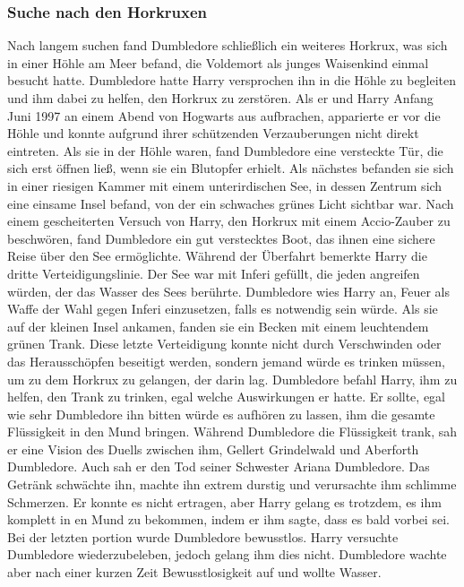 \documentclass[a4paper, 10pt]{article}
\begin{document}
\subsubsection*{Suche nach den Horkruxen}
Nach langem suchen fand Dumbledore schließlich ein weiteres Horkrux, was sich in einer Höhle am Meer befand, die Voldemort als junges Waisenkind einmal besucht hatte. Dumbledore hatte Harry versprochen ihn in die Höhle zu begleiten und ihm dabei zu helfen, den Horkrux zu zerstören. Als er und Harry Anfang Juni 1997 an einem Abend von Hogwarts aus aufbrachen, apparierte er vor die Höhle und konnte aufgrund ihrer schützenden Verzauberungen nicht direkt eintreten. Als sie in der Höhle waren, fand Dumbledore eine versteckte Tür, die sich erst öffnen ließ, wenn sie ein Blutopfer erhielt.
\vspace{10pt}
\newline
Als nächstes befanden sie sich in einer riesigen Kammer mit einem unterirdischen See, in dessen Zentrum sich eine einsame Insel befand, von der ein schwaches grünes Licht sichtbar war. Nach einem gescheiterten Versuch von Harry, den Horkrux mit einem Accio-Zauber zu beschwören, fand Dumbledore ein gut verstecktes Boot, das ihnen eine sichere Reise über den See ermöglichte. Während der Überfahrt bemerkte Harry die dritte Verteidigungslinie. Der See war mit Inferi gefüllt, die jeden angreifen würden, der das Wasser des Sees berührte. Dumbledore wies Harry an, Feuer als Waffe der Wahl gegen Inferi einzusetzen, falls es notwendig sein würde.
\vspace{10pt}
\newline
Als sie auf der kleinen Insel ankamen, fanden sie ein Becken mit einem leuchtendem grünen Trank. Diese letzte Verteidigung konnte nicht durch Verschwinden oder das Herausschöpfen beseitigt werden, sondern jemand würde es trinken müssen, um zu dem Horkrux zu gelangen, der darin lag. Dumbledore befahl Harry, ihm zu helfen, den Trank zu trinken, egal welche Auswirkungen er hatte. Er sollte, egal wie sehr Dumbledore ihn bitten würde es aufhören zu lassen, ihm die gesamte Flüssigkeit in den Mund bringen.
\vspace{10pt}
\newline
Während Dumbledore die Flüssigkeit trank, sah er eine Vision des Duells zwischen ihm, Gellert Grindelwald und Aberforth Dumbledore. Auch sah er den Tod seiner Schwester Ariana Dumbledore. Das Getränk schwächte ihn, machte ihn extrem durstig und verursachte ihm schlimme Schmerzen. Er konnte es nicht ertragen, aber Harry gelang es trotzdem, es ihm komplett in en Mund zu bekommen, indem er ihm sagte, dass es bald vorbei sei. Bei der letzten portion wurde Dumbledore bewusstlos. Harry versuchte Dumbledore wiederzubeleben, jedoch gelang ihm dies nicht. Dumbledore wachte aber nach einer kurzen Zeit Bewusstlosigkeit auf und wollte Wasser.
\end{document}
